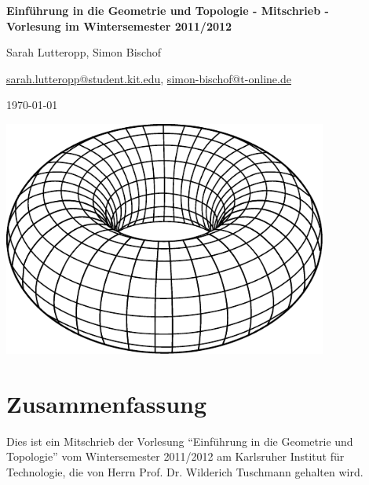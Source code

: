 \documentclass[a4paper,11pt,notitlepage]{report}
\theoremstyle{definition}
\begin{document}
\setcounter{chapter}{0}

\begin{titlepage}
	\begin{center}	
		\LARGE \textbf{{Einführung in die Geometrie und Topologie - Mitschrieb -} \\[5ex] 
    		{\Large Vorlesung im Wintersemester 2011/2012\\[5ex]}}
	\end{center}
	\begin{center}
		\Large Sarah Lutteropp, Simon Bischof
	\end{center}
	\begin{center}
		\href{mailto:sarah.lutteropp@student.kit.edu}{sarah.lutteropp@student.kit.edu}, 
		\href{mailto:simon-bischof@t-online.de}{simon-bischof@t-online.de}
	\end{center}
	\begin{center}
		\today
	\end{center}
	\vspace{2cm}
	\begin{center}
		\includegraphics[width=0.8\textwidth]{torus2.pdf}
	\end{center}
\end{titlepage}
\setcounter{tocdepth}{1}
\tableofcontents

\section*{Zusammenfassung}
Dies ist ein Mitschrieb der Vorlesung “Einführung in die Geometrie und Topologie” vom Wintersemester 2011/2012 am Karlsruher Institut für Technologie, die von Herrn Prof. Dr. Wilderich Tuschmann gehalten wird.
\end{document}
